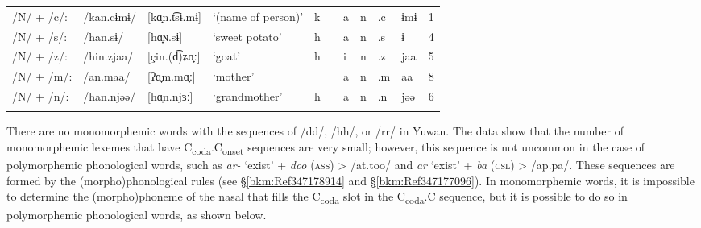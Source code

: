 \begin{sidewaystable}
\begin{tabular}{ *{10}{l} S[table-format=1] }
{/N/ + /c/:} & {/kan.cɨmɨ/}      & [kɑ̟n.t͡sɨ.mɨ]      &  {‘(name of person)’}  &  k  & &    a  &  n   &  .c & ɨmɨ & 1\\
{/N/ + /s/:} & {/han.sɨ/}        & [hɑ̟ɴ.sɨ]           &  {‘sweet potato’}      &  h  & &    a  &  n   &  .s & ɨ & 4\\
{/N/ + /z/:} & {/hin.zjaa/}      & [çin.(d͡)ʑɑ̟ː]      &  {‘goat’}              &  h  & &    i  &  n   &  .z & jaa & 5\\
{/N/ + /m/:} & {/an.maa/}        & [ʔɑ̟m.mɑ̟ː]         &   {‘mother’}           &  &   &a   &     n &   .m  &  aa & 8\\
{/N/ + /n/:} & {/han.njəə/}      & [hɑ̟n.njɜː]         &  {‘grandmother’}       &  h  &  &    a  &  n    & .n & jəə & 6\\
\lspbottomrule
\end{tabular}
\end{sidewaystable}

There are no monomorphemic words with the sequences of /dd/, /hh/, or /rr/ in Yuwan. The data show that the number of monomorphemic lexemes that have C\textsubscript{coda}.C\textsubscript{onset} sequences are very small; however, this sequence is not uncommon in the case of polymorphemic phonological words, such as \textit{ar-} ‘exist’ + \textit{doo} (\textsc{ass}) > /at.too/ and \textit{ar} ‘exist’ + \textit{ba} (\textsc{csl}) > /ap.pa/. These sequences are formed by the (morpho)phonological rules (see §\ref{bkm:Ref347178914} and §\ref{bkm:Ref347177096}). In monomorphemic words, it is impossible to determine the (morpho)phoneme of the nasal that fills the C\textsubscript{coda} slot in the C\textsubscript{coda}.C sequence, but it is possible to do so in polymorphemic phonological words, as shown below.

